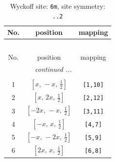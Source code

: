 \documentclass[fleqn,8pt]{jsarticle}
\begin{document}
\renewcommand{\arraystretch}{1.2}
\begin{longtable}{ccc}
\caption{Wyckoff site: {\tt 6m}, site symmetry: {\tt ..2}}
 \\
 \hline \hline
No. & position & mapping \\ \hline \endfirsthead

\multicolumn{2}{l}{\tablename\ \thetable{}} \\
 \hline \hline
No. & position & mapping \\ \hline \endhead

 \hline \hline
\multicolumn{2}{r}{\footnotesize\it continued ...} \\ \endfoot

 \hline \hline
\multicolumn{2}{r}{} \\ \endlastfoot

1 & $\left[ x,\, - x,\, \frac{1}{2} \right]$ & {\tt [1,10]} \\ \hline
2 & $\left[ x,\, 2 x,\, \frac{1}{2} \right]$ & {\tt [2,12]} \\ \hline
3 & $\left[ - 2 x,\, - x,\, \frac{1}{2} \right]$ & {\tt [3,11]} \\ \hline
4 & $\left[ - x,\, x,\, \frac{1}{2} \right]$ & {\tt [4,7]} \\ \hline
5 & $\left[ - x,\, - 2 x,\, \frac{1}{2} \right]$ & {\tt [5,9]} \\ \hline
6 & $\left[ 2 x,\, x,\, \frac{1}{2} \right]$ & {\tt [6,8]} \\
\end{longtable}
\renewcommand{\arraystretch}{1.2}
\end{document}
